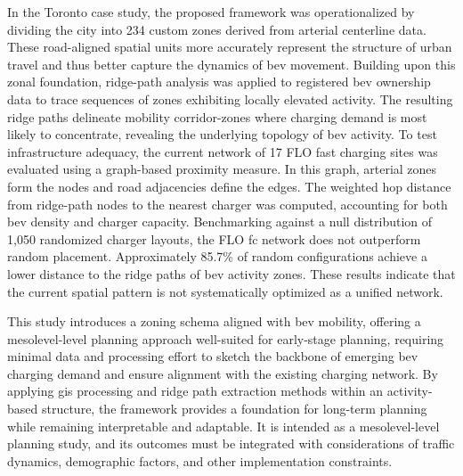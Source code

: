 In the Toronto case study, the proposed framework was operationalized by dividing the city into 234 custom zones derived from arterial centerline data. These road-aligned spatial units more accurately represent the structure of urban travel and thus better capture the dynamics of \gls{bev} movement. Building upon this zonal foundation, ridge-path analysis was applied to registered \gls{bev} ownership data to trace sequences of zones exhibiting locally elevated activity. The resulting ridge paths delineate mobility corridor-zones where charging demand is most likely to concentrate, revealing the underlying topology of \gls{bev} activity. 
To test infrastructure adequacy, the current network of 17 FLO fast charging sites was evaluated using a graph-based proximity measure. In this graph, arterial zones form the nodes and road adjacencies define the edges. The weighted hop distance from ridge-path nodes to the nearest charger was computed, accounting for both \gls{bev} density and charger capacity. Benchmarking against a null distribution of 1{,}050 randomized charger layouts, the FLO \gls{fc} network does not outperform random placement. Approximately 85.7\% of random configurations achieve a lower distance to the ridge paths of \gls{bev} activity zones. These results indicate that the current spatial pattern is not systematically optimized as a unified network.
  

This study introduces a zoning schema aligned with \gls{bev} mobility, offering a \gls{mesolevel}-level planning approach well-suited for early-stage planning, requiring minimal data and processing effort to sketch the backbone of emerging \gls{bev} charging demand and ensure alignment with the existing charging network. By applying \gls{gis} processing and ridge path extraction methods within an activity-based structure, the framework provides a foundation for long-term planning while remaining interpretable and adaptable. It is intended as a \gls{mesolevel}-level planning study, and its outcomes must be integrated with considerations of traffic dynamics, demographic factors, and other implementation constraints.

